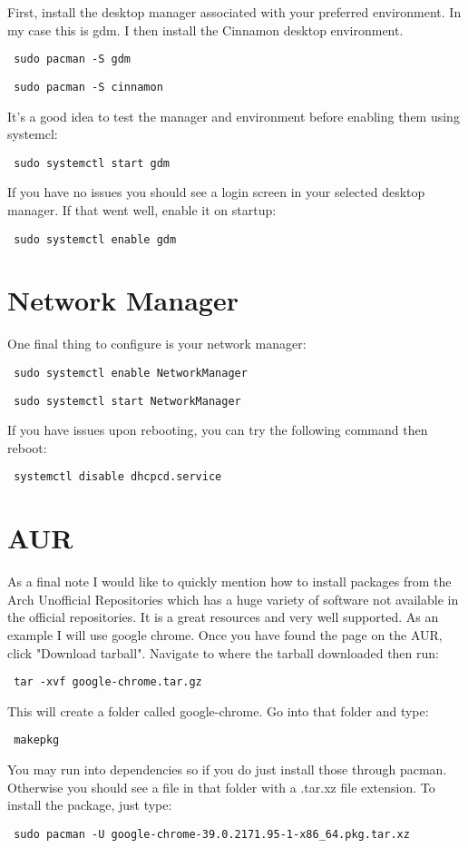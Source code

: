 \documentclass[12pt]{article}
\begin{document}
    First, install the desktop manager associated with your preferred
    environment. In my case this is gdm. I then install the Cinnamon desktop
    environment.
    \begin{verbatim} sudo pacman -S gdm \end{verbatim}
    \begin{verbatim} sudo pacman -S cinnamon \end{verbatim}
    It's a good idea to test the manager and environment before enabling them
    using systemcl:
    \begin{verbatim} sudo systemctl start gdm \end{verbatim}
    If you have no issues you should see a login screen in your selected desktop
    manager. If that went well, enable it on startup:
    \begin{verbatim} sudo systemctl enable gdm \end{verbatim}

\section*{Network Manager}
    One final thing to configure is your network manager:
    \begin{verbatim} sudo systemctl enable NetworkManager \end{verbatim}
    \begin{verbatim} sudo systemctl start NetworkManager \end{verbatim}
    If you have issues upon rebooting, you can try the following command then
    reboot:
    \begin{verbatim} systemctl disable dhcpcd.service \end{verbatim}

\section*{AUR}
    As a final note I would like to quickly mention how to install packages
    from the Arch Unofficial Repositories which has a huge variety of software
    not available in the official repositories. It is a great resources and
    very well supported.
    As an example I will use google chrome. Once you have found the page on the
    AUR, click "Download tarball". Navigate to where the tarball downloaded
    then run:
    \begin{verbatim} tar -xvf google-chrome.tar.gz \end{verbatim}
    This will create a folder called google-chrome. Go into that folder and
    type:
    \begin{verbatim} makepkg \end{verbatim}
    You may run into dependencies so if you do just install those through
    pacman. Otherwise you should see a file in that folder with a .tar.xz file
    extension. To install the package, just type:
    \begin{verbatim} sudo pacman -U google-chrome-39.0.2171.95-1-x86_64.pkg.tar.xz \end{verbatim}
\end{document}

